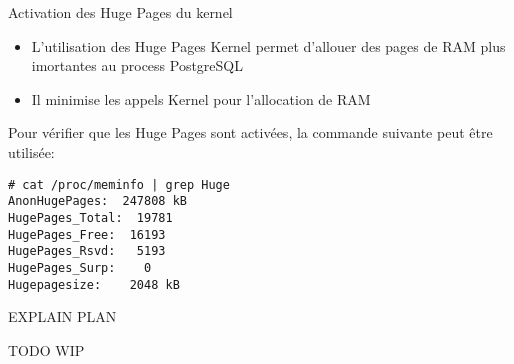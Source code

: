 
\begin{frame}[fragile]{Activation des Huge Pages du kernel}

   \begin{itemize}
      \item L'utilisation des Huge Pages Kernel permet d'allouer des pages de RAM plus imortantes au process PostgreSQL
      \item Il minimise les appels Kernel pour l'allocation de RAM
   \end{itemize}

   Pour vérifier que les Huge Pages sont activées, la commande suivante peut être utilisée:

\begin{tiny}
\begin{Verbatim}[commandchars=\\\{\}]
# cat /proc/meminfo | grep Huge
AnonHugePages:  247808 kB
HugePages_Total:  19781
HugePages_Free:  16193
HugePages_Rsvd:   5193
HugePages_Surp:    0
Hugepagesize:    2048 kB
\end{Verbatim}
\end{tiny}

\begin{toile}
\end{toile}

\end{frame}


\begin{frame}[fragile]{EXPLAIN PLAN}

   TODO
   WIP

\begin{toile}
\end{toile}

\end{frame}


